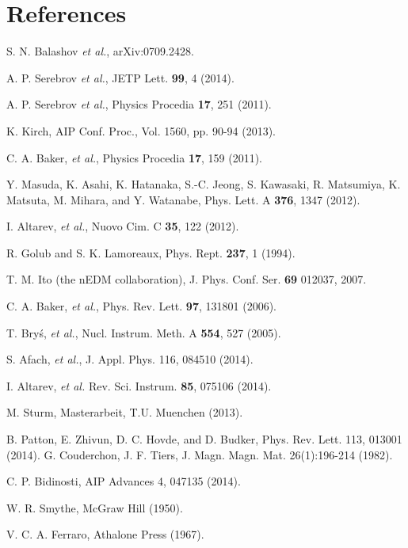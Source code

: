 \documentclass[review]{elsarticle}
\begin{document}
\section*{References}


\begin{thebibliography}{00}

 S. N. Balashov {\it et al.}, arXiv:0709.2428.

 A. P. Serebrov {\it et al.}, JETP Lett. {\bf 99}, 4
  (2014).

 A. P. Serebrov {\it et al.}, Physics Procedia {\bf
  17}, 251 (2011).

 K. Kirch, AIP Conf. Proc., Vol. 1560, pp. 90-94
  (2013).

 C. A. Baker, {\it et al.}, Physics Procedia {\bf
  17}, 159 (2011).

 Y. Masuda, K. Asahi, K. Hatanaka, S.-C. Jeong,
  S. Kawasaki, R. Matsumiya, K. Matsuta, M. Mihara, and Y. Watanabe,
  Phys. Lett. A {\bf 376}, 1347 (2012).

 I. Altarev, {\it et al.}, Nuovo Cim. C {\bf
  35}, 122 (2012).

 R. Golub and S. K. Lamoreaux, Phys. Rept.  {\bf
  237}, 1 (1994).

 T. M. Ito (the nEDM collaboration),
  J. Phys. Conf. Ser. {\bf 69} 012037, 2007.

 C. A. Baker, {\it et al.}, Phys. Rev. Lett. {\bf
  97}, 131801 (2006).

 T. Bry\'s, {\it et al.}, Nucl. Instrum. Meth. A
  {\bf 554}, 527 (2005).

 S. Afach, {\it et al.}, J. Appl. Phys. 116, 084510 (2014).

 I. Altarev, {\it et al.}
  Rev. Sci. Instrum. {\bf 85}, 075106 (2014).

 M. Sturm, Masterarbeit, T.U. Muenchen (2013).

 B. Patton, E. Zhivun, D. C. Hovde, and D. Budker,
  Phys. Rev. Lett. 113, 013001 (2014).
 G. Couderchon, J. F. Tiers, J. Magn. Magn. Mat. 26(1):196-214 (1982).

 C. P. Bidinosti, AIP Advances 4, 047135 (2014).

 W. R. Smythe, McGraw Hill (1950).

 V. C. A. Ferraro, Athalone Press (1967).
\end{thebibliography}
\end{document}
